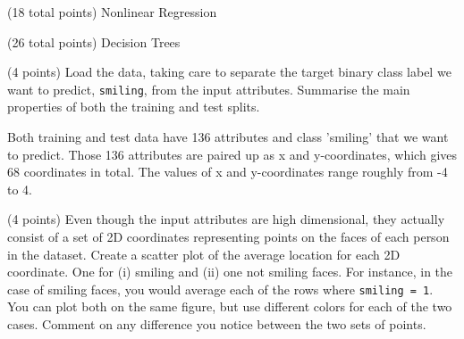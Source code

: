 \documentclass[12pt]{article}
\begin{document}
\begin{question}{(18 total points) Nonlinear Regression}
\begin{subquestion}
\end{subquestion}



\end{question}






\clearpage


\begin{question}{(26 total points) Decision Trees}





%
%
\begin{subquestion}{(4 points) Load the data, taking care to separate the target binary class label we want to predict, \texttt{smiling}, from the input attributes. 
Summarise the main properties of both the training and test splits. 
}


\begin{answerbox}{12em}
Both training and test data have 136 attributes and class 'smiling' that we want to predict.
Those 136 attributes are paired up as x and y-coordinates, which gives 68 coordinates in total. 
The values of x and y-coordinates range roughly from -4 to 4.
\end{answerbox}



\end{subquestion}


%
%
\begin{subquestion}{(4 points) Even though the input attributes are high dimensional, they actually consist of a set of 2D coordinates representing points on the faces of each person in the dataset. 
Create a scatter plot of the average location for each 2D coordinate. One for (i) smiling and (ii) one not smiling faces. 
For instance, in the case of smiling faces, you would average each of the rows where \texttt{smiling = 1}. 
You can plot both on the same figure, but use different colors for each of the two cases. 
Comment on any difference you notice between the two sets of points. \\
}



\end{subquestion}
\end{question}
\end{document}
